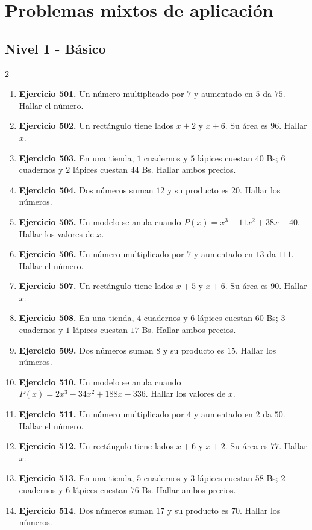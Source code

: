 \documentclass[10pt,a4paper]{article}
\newcommand{\nivel}[1]{\subsection*{#1}\addcontentsline{toc}{subsection}{#1}}
\begin{document}
\section{Problemas mixtos de aplicación}
\nivel{Nivel 1 - Básico}
\begin{multicols}{2}
\begin{enumerate}[label=\textbf{\arabic*.}]
\item \textbf{Ejercicio 501.} Un número multiplicado por \(7\) y aumentado en \(5\) da \(75\). Hallar el número.
\item \textbf{Ejercicio 502.} Un rectángulo tiene lados \(x+2\) y \(x+6\). Su área es \(96\). Hallar \(x\).
\item \textbf{Ejercicio 503.} En una tienda, \(1\) cuadernos y \(5\) lápices cuestan \(40\) Bs; \(6\) cuadernos y \(2\) lápices cuestan \(44\) Bs. Hallar ambos precios.
\item \textbf{Ejercicio 504.} Dos números suman \(12\) y su producto es \(20\). Hallar los números.
\item \textbf{Ejercicio 505.} Un modelo se anula cuando \(P(x)=x^{3} - 11 x^{2} + 38 x - 40\). Hallar los valores de \(x\).
\item \textbf{Ejercicio 506.} Un número multiplicado por \(7\) y aumentado en \(13\) da \(111\). Hallar el número.
\item \textbf{Ejercicio 507.} Un rectángulo tiene lados \(x+5\) y \(x+6\). Su área es \(90\). Hallar \(x\).
\item \textbf{Ejercicio 508.} En una tienda, \(4\) cuadernos y \(6\) lápices cuestan \(60\) Bs; \(3\) cuadernos y \(1\) lápices cuestan \(17\) Bs. Hallar ambos precios.
\item \textbf{Ejercicio 509.} Dos números suman \(8\) y su producto es \(15\). Hallar los números.
\item \textbf{Ejercicio 510.} Un modelo se anula cuando \(P(x)=2 x^{3} - 34 x^{2} + 188 x - 336\). Hallar los valores de \(x\).
\item \textbf{Ejercicio 511.} Un número multiplicado por \(4\) y aumentado en \(2\) da \(50\). Hallar el número.
\item \textbf{Ejercicio 512.} Un rectángulo tiene lados \(x+6\) y \(x+2\). Su área es \(77\). Hallar \(x\).
\item \textbf{Ejercicio 513.} En una tienda, \(5\) cuadernos y \(3\) lápices cuestan \(58\) Bs; \(2\) cuadernos y \(6\) lápices cuestan \(76\) Bs. Hallar ambos precios.
\item \textbf{Ejercicio 514.} Dos números suman \(17\) y su producto es \(70\). Hallar los números.

\end{enumerate}
\end{multicols}
\end{document}
